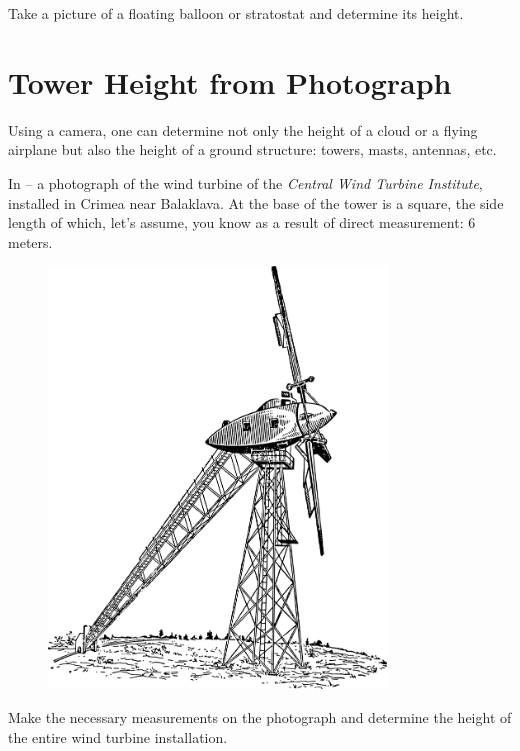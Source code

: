 Take a picture of a floating balloon or stratostat and determine its height.


\section{Tower Height from Photograph}
\label{sec-3.16}

\ques Using a camera, one can determine not only the height of a cloud or a flying airplane but also the height of a ground structure: towers, masts, antennas, etc.

In  -- a photograph of the wind turbine of the \emph{Central Wind Turbine Institute}, installed in Crimea near Balaklava. At the base of the tower is a square, the side length of which, let's assume, you know as a result of direct measurement: 6 meters.

\begin{figure}[h!]
\centering
\includegraphics[width=0.8\textwidth]{figures/ch-03/fig-078.pdf}
\end{figure}

Make the necessary measurements on the photograph and determine the height of the entire wind turbine installation.


